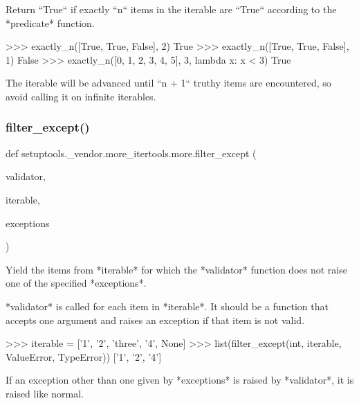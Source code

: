 \begin{DoxyVerb}Return ``True`` if exactly ``n`` items in the iterable are ``True``
according to the *predicate* function.

    >>> exactly_n([True, True, False], 2)
    True
    >>> exactly_n([True, True, False], 1)
    False
    >>> exactly_n([0, 1, 2, 3, 4, 5], 3, lambda x: x < 3)
    True

The iterable will be advanced until ``n + 1`` truthy items are encountered,
so avoid calling it on infinite iterables.\end{DoxyVerb}
 \mbox{\label{namespacesetuptools_1_1__vendor_1_1more__itertools_1_1more_a802b5d5b5f40739f916923c05e859072}} 
\subsubsection{\texorpdfstring{filter\+\_\+except()}{filter\_except()}}
{\footnotesize\ttfamily def setuptools.\+\_\+vendor.\+more\+\_\+itertools.\+more.\+filter\+\_\+except (\begin{DoxyParamCaption}\item[{}]{validator,  }\item[{}]{iterable,  }\item[{}]{exceptions }\end{DoxyParamCaption})}

\begin{DoxyVerb}Yield the items from *iterable* for which the *validator* function does
not raise one of the specified *exceptions*.

*validator* is called for each item in *iterable*.
It should be a function that accepts one argument and raises an exception
if that item is not valid.

>>> iterable = ['1', '2', 'three', '4', None]
>>> list(filter_except(int, iterable, ValueError, TypeError))
['1', '2', '4']

If an exception other than one given by *exceptions* is raised by
*validator*, it is raised like normal.
\end{DoxyVerb}
 \mbox{\label{namespacesetuptools_1_1__vendor_1_1more__itertools_1_1more_a74224dd623db9ad4e472e637a282d5d4}} 
